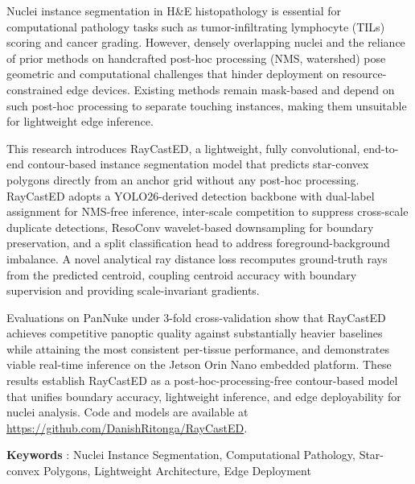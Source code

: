 Nuclei instance segmentation in H\&E histopathology is essential for computational pathology tasks such as tumor-infiltrating lymphocyte (TILs) scoring and cancer grading. However, densely overlapping nuclei and the reliance of prior methods on handcrafted post-hoc processing (NMS, watershed) pose geometric and computational challenges that hinder deployment on resource-constrained edge devices. Existing methods remain mask-based and depend on such post-hoc processing to separate touching instances, making them unsuitable for lightweight edge inference.

This research introduces RayCastED, a lightweight, fully convolutional, end-to-end contour-based instance segmentation model that predicts star-convex polygons directly from an anchor grid without any post-hoc processing. RayCastED adopts a YOLO26-derived detection backbone with dual-label assignment for NMS-free inference, inter-scale competition to suppress cross-scale duplicate detections, ResoConv wavelet-based downsampling for boundary preservation, and a split classification head to address foreground-background imbalance. A novel analytical ray distance loss recomputes ground-truth rays from the predicted centroid, coupling centroid accuracy with boundary supervision and providing scale-invariant gradients.

Evaluations on PanNuke under 3-fold cross-validation show that RayCastED achieves competitive panoptic quality against substantially heavier baselines while attaining the most consistent per-tissue performance, and demonstrates viable real-time inference on the Jetson Orin Nano embedded platform. These results establish RayCastED as a post-hoc-processing-free contour-based model that unifies boundary accuracy, lightweight inference, and edge deployability for nuclei analysis. Code and models are available at \url{https://github.com/DanishRitonga/RayCastED}.

\noindent\textbf{Keywords} : Nuclei Instance Segmentation, Computational Pathology, Star-convex Polygons, Lightweight Architecture, Edge Deployment
